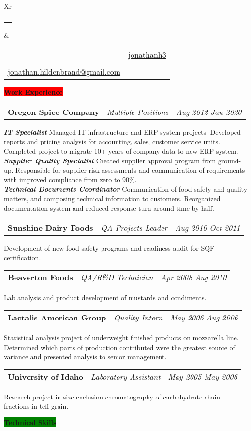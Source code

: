 \documentclass[letterpaper,12pt]{article}[leftmargin=*]
\makeatletter
\def\fullname{Jonathan Hildenbrand}
\def\linkedinicon{\faLinkedin}
\def\linkedinlink{https://linkedin.com/in/jonathanh3}
\def\linkedintext{jonathanh3}
\def\phoneicon{\faPhone}
\def\phonetext{+1-971-409-0695}
\def\emailicon{\faEnvelope}
\def\emaillink{mailto:jonathan.hildenbrand+resume@gmail.com}
\def\emailtext{jonathan.hildenbrand@gmail.com}
\def\locationicon{\faMapMarker}
\def\locationtext{Portland, Oregon}
\def\targeticon{\faBinoculars}
\def\targettext{Local \& Remote}
\def\headertype{\doublecol} %
\def\location{\hspace{3pt}\locationicon \hspace{5pt}{\color{links}\locationtext}}
\def\target{\targeticon\hspace{3pt}{\color{links}\targettext}}
\def\phone{\phoneicon\hspace{3pt}{\color{links}{\phonetext}}}
\def\linkedin{\linkedinicon\hspace{3pt}\href{\linkedinlink}{\underline{\linkedintext}}}
\def\email{\emailicon\hspace{3pt}\href{\emaillink}{\underline{\emailtext}}}
\newcommand{\skills}[2]{\vspace{4pt}
  \colorbox{Green}{\color{white}#1\hspace{9pt}\raggedbottom\normalsize\textbf{#2\hspace{4pt}}}
}
\newcommand{\experience}[2]{\vspace{4pt}
  \colorbox{Red}{\color{white}#1\hspace{9pt}\raggedbottom\normalsize\textbf{#2\hspace{4pt}}}
}
\newcommand{\resumeSectionStart}{\begin{itemize}[leftmargin=0.1in]}
\newcommand{\resumeSectionEnd}{\end{itemize}}
\newcommand{\resumeExperience}[3]{
  \vspace{-6pt}
  \item[]
    \begin{tabularx}{0.97\textwidth}{>{\raggedright}X >{\raggedright\arraybackslash}X >{\raggedleft\arraybackslash}X}
      \textbf{\color{primary}#1} & \textit{\color{accent}#2} & \textit{\color{accent}\small#3} \\
  \end{tabularx}
    
}
\newcommand{\doublecol}[6]{
  \begin{tabularx}{\textwidth}{Xr}
    {
      \begin{tabular}[c]{l}
        \fontsize{24}{34}\selectfont{\color{primary}{{\textbf{\fullname}}}}
      \end{tabular}
    } & {
      \begin{tabular}[c]{l@{\hspace{1.5em}} l}
        {\small#4} & {\small#1} \\
        {\small#5} & {\small#2} \\
        {\small#6} & {\small#3}
      \end{tabular}
    }
  \end{tabularx}
}
\newcommand{\singlecol}[6]{
  \begin{tabularx}{\textwidth}{Xr}
    {
      \begin{tabular}[b]{l}
        \fontsize{35}{45}\selectfont{\color{primary}{{\textbf{\fullname}}}} \\
        {\textit{\subtitle}} %
      \end{tabular}
    } & {
      \begin{tabular}[c]{l}
        {\small#1} \\
        {\small#2} \\
        {\small#3} \\
        {\small#4} \\
        {\small#5} \\
        {\small#6}
      \end{tabular}
    }
  \end{tabularx}
}
\makeatother
\begin{document}
\headertype{\linkedin}{\phone}{}{\location}{\target}{\email} %

\experience{\faPieChart}{Work Experience}

\resumeSectionStart{\resumeExperience{Oregon Spice Company}{Multiple Positions}{Aug 2012 \textemdash{} Jan 2020}\textbf{\textit{\color{accent}IT Specialist}} \textemdash{} Managed IT infrastructure and ERP system projects. Developed reports and pricing analysis for accounting, sales, customer service units. Completed project to migrate 10+ years of company data to new ERP system.\\ \textbf{\textit{\color{accent}Supplier Quality Specialist}} \textemdash{} Created supplier approval program from ground-up. Responsible for supplier risk assessments and communication of requirements with improved compliance from zero to 90\%. \\ \textbf{\textit{\color{accent}Technical Documents Coordinator}} \textemdash{} Communication of food safety and quality matters, and composing technical information to customers. Reorganized documentation system and reduced response turn-around-time by half.}\vspace{-6pt}\resumeSectionEnd{}
\resumeSectionStart{\resumeExperience{Sunshine Dairy Foods}{QA Projects Leader}{Aug 2010 \textemdash{} Oct 2011}Development of new food safety programs and readiness audit for SQF certification.}\vspace{-6pt}\resumeSectionEnd{}
\resumeSectionStart{\resumeExperience{Beaverton Foods}{QA/R\&D Technician}{Apr 2008 \textemdash{} Aug 2010}Lab analysis and product development of mustards and condiments.}\vspace{-6pt}\resumeSectionEnd{}
\resumeSectionStart{\resumeExperience{Lactalis American Group}{Quality Intern}{May 2006 \textemdash{} Aug 2006}Statistical analysis project of underweight finished products on mozzarella line. Determined which parts of production contributed were the greatest source of variance and presented analysis to senior management.}\vspace{-6pt}\resumeSectionEnd{}
\resumeSectionStart{\resumeExperience{University of Idaho}{Laboratory Assistant}{May 2005 \textemdash{} May 2006}Research project in size exclusion chromatography of carbohydrate chain fractions in teff grain.}\vspace{-6pt}\resumeSectionEnd{}

\skills{\faGears}{Technical Skills}
\end{document}
